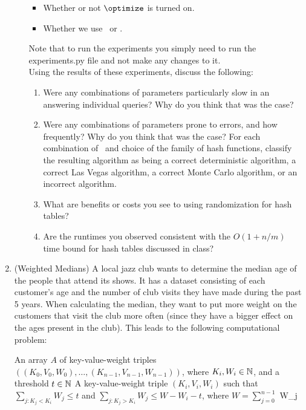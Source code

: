 \documentclass[11pt]{article}
\begin{document}
\begin{enumerate}
\begin{enumerate}
\begin{itemize}
        \item Whether or not $\optimize$ is turned on.
        \item Whether we use \DeterministicHash\ or 
        \RandomHash.
    \end{itemize}
    Note that to run the experiments you simply need to run the experiments.py file and not make any changes to it.\\
    Using the results of these experiments, discuss the following:
    \begin{enumerate}
        \item Were any combinations of parameters particularly slow in an answering individual queries?  Why do you think that was the case?
        \item Were any combinations of parameters prone to errors, and how frequently?  Why do you think that was the case?  For each combination of \optimize\ and choice of the family of hash functions, classify the resulting algorithm as being a correct deterministic algorithm, a correct Las Vegas algorithm, a correct Monte Carlo algorithm, or an incorrect algorithm.
        \item What are benefits or costs you see to using randomization for hash tables?
        \item Are the runtimes you observed consistent with the $O(1+n/m)$ time bound for hash tables discussed in class?


 
    

\end{enumerate}
\end{enumerate}


\item (Weighted Medians)  
    A local jazz club wants to determine the median age of the people that attend its shows. It has a dataset consisting of each customer's age and the number of club visits they have made during the past 5 years.  When calculating the median, they want to put more weight on the customers that visit the club more often (since they have a bigger effect on the ages present in the club).  This leads to the following computational problem:

    \compprob{\WeightedSelection}
{An array $A$ of key-value-weight triples $((K_0,V_0,W_0),\ldots,(K_{n-1},V_{n-1},W_{n-1}))$, where $K_i, W_i\in \mathbb{N}$,  and a threshold $t\in \mathbb{N}$}
{ A key-value-weight triple $(K_i,V_i,W_i)$ such that $\sum_{j : K_j<K_i} W_j \leq t$ and 
$\sum_{j : K_j>K_i} W_j \leq W-W_i-t$, where $W=\sum_{j=0}^{n-1}$ W_j}



\end{enumerate}
\end{document}
